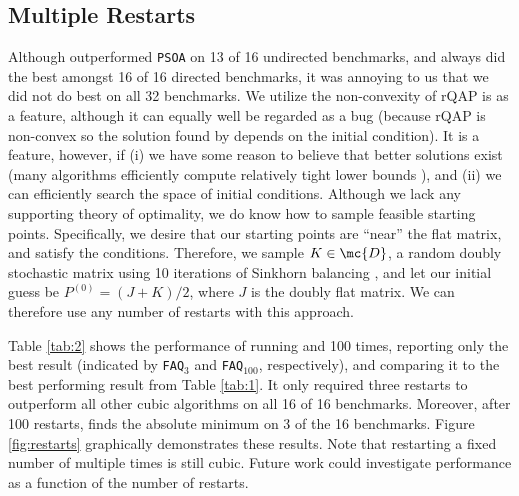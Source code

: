 \documentclass[10pt,journal,cspaper,compsoc]{IEEEtran}
\begin{document}


\subsection{Multiple Restarts} %
\label{sub:multiple_restarts}

Although \FAQ outperformed \texttt{PSOA} on 13 of 16 undirected benchmarks, and always did the best amongst 16 of 16 directed benchmarks, it was annoying to us that we did not do best on all 32 benchmarks.  
% 
We utilize the non-convexity of rQAP is as a feature, although it can equally well be regarded as a bug  (because rQAP is non-convex so the solution found by \FAQ depends on the initial condition).  It is a feature, however, if (i) we have some reason to believe that better solutions exist (many algorithms efficiently compute relatively tight lower bounds \cite{Anstreicher2009}), and (ii) we can efficiently search the space of initial conditions.  Although we  lack any supporting theory of optimality, we do know how to sample feasible starting points.  Specifically, we desire that our starting points are ``near'' the flat matrix, and satisfy the conditions.  Therefore, we  sample $K \in \mc{D}$, a random doubly stochastic matrix using 10 iterations of Sinkhorn balancing \cite{Sinkhorn1964}, and let our initial guess be $P^{(0)}=(J+K)/2$, where $J$ is the doubly flat matrix.  We can therefore use any number of restarts with this approach.  

Table \ref{tab:2} shows the performance of running  and 100 times, reporting only the best result (indicated by \texttt{FAQ}$_3$ and \texttt{FAQ}$_{100}$, respectively), and comparing it to the best performing result from Table \ref{tab:1}.  It only required three restarts to outperform all other cubic algorithms on all 16 of 16 benchmarks.  Moreover, after 100 restarts, \FAQ finds the absolute minimum on 3 of the 16 benchmarks. Figure \ref{fig:restarts} graphically demonstrates these results. 
 Note that restarting \FAQ a fixed number of multiple times is still cubic.  Future work could investigate performance as a function of the number of restarts. %
\end{document}
